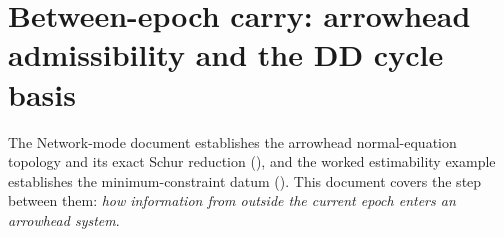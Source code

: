 \documentclass[main.tex]{subfiles}
\begin{document}

\section{Between-epoch carry: arrowhead admissibility and the DD cycle basis}
\label{sec:net-carry}

\providecommand{\Nss}{\bm{N}_{ss}}            %
\providecommand{\Nrr}{\bm{N}_{rr}}            %
\providecommand{\Nsr}{\bm{N}_{sr}}            %
\providecommand{\redNss}{\tilde{\bm{N}}_{ss}} %
\providecommand{\redus}{\tilde{\bm{u}}_s}     %
\providecommand{\xshared}{\bm{x}_s}           %
\providecommand{\xlocal}[1]{\bm{x}_{#1}}      %
\providecommand{\Czmat}{\bm{C}_L}             %
\providecommand{\Czrx}[1]{\bm{C}_{L,#1}}      %
\providecommand{\Pzmat}{\bm{P}^{z}}           %
\providecommand{\Pzinv}{(\bm{P}^{z})^{-1}}
\providecommand{\Pzpost}{\bm{P}^{z+}}
\providecommand{\Pzprior}{\bm{P}^{z,\mathrm{prior}}}
\providecommand{\Bfold}{\bm{B}}               %
\providecommand{\Gfold}{\bm{G}}               %
\providecommand{\Mfold}{\bm{M}}               %
\providecommand{\zfreev}{\bm{z}_{\mathrm{free}}}
\providecommand{\Sigss}{\bm{\Sigma}_{ss}}     %
\providecommand{\arcset}{\mathcal{E}}         %

The Network-mode document establishes the arrowhead normal-equation
topology and its exact Schur reduction
(), and the worked estimability example establishes
the minimum-constraint datum
().  This
document covers the step between them: \emph{how information from
outside the current epoch enters an arrowhead system}.
\end{document}
